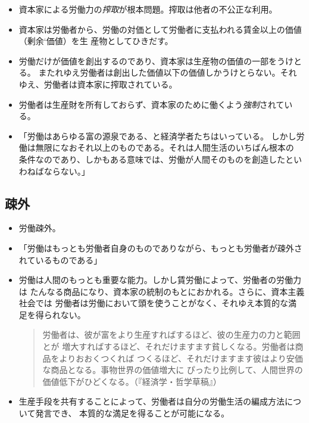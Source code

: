 \documentclass[uplatex,dvipdfmx]{jsarticle} \usepackage{mystyle}%
\begin{document}
\begin{itemize}
\item 資本家による労働力の\emph{搾取}が根本問題。搾取は他者の不公正な利用。
\item 資本家は労働者から、労働の対価として労働者に支払われる賃金以上の価値（剰余`価値）を生
  産物としてひきだす。
  \item 労働だけが価値を創出するのであり、資本家は生産物の価値の一部をうけとる。
またれゆえ労働者は創出した価値以下の価値しかうけとらない。それゆえ、労働者は資本家に搾取されている。
\item 労働者は生産財を所有しておらず、資本家のために働くよう\emph{強制}されている。

\item 「労働はあらゆる富の源泉である、と経済学者たちはいっている。
しかし労働は無限になおそれ以上のものである。それは人間生活のいちばん根本の
条件なのであり、しかもある意味では、労働が人間そのものを創造したといわねばならない。」

\end{itemize}

\subsection{疎外}

\begin{itemize}
\item 労働疎外。


\item 「労働はもっとも労働者自身のものでありながら、もっとも労働者が疎外されているものである」
\item 労働は人間のもっとも重要な能力。しかし賃労働によって、労働者の労働力は
たんなる商品になり、資本家の統制のもとにおかれる。さらに、資本主義社会では
労働者は労働において頭を使うことがなく、それゆえ本質的な満足を得られない。

  \begin{quote}
    労働者は、彼が富をより生産すればするほど、彼の生産力の力と範囲とが
増大すればするほど、それだけますます貧しくなる。労働者は商品をよりおおくつくれば
つくるほど、それだけますます彼はより安価な商品となる。事物世界の価値増大に
ぴったり比例して、人間世界の価値低下がひどくなる。（『経済学・哲学草稿』）
  \end{quote}


\item 生産手段を共有することによって、労働者は自分の労働生活の編成方法について発言でき、
本質的な満足を得ることが可能になる。

\end{itemize}
\end{document}
